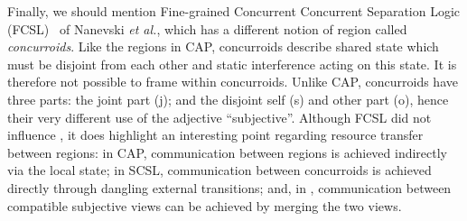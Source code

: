 


Finally, we should mention Fine-grained Concurrent Concurrent Separation Logic
(FCSL)~\cite{scsl-esop14} of Nanevski {\em et al.}, which has a different notion
of region called {\em concurroids}. Like the regions in CAP,  concurroids describe
shared state which must be disjoint from each other and static
interference acting on this state. It is therefore not
possible to frame within concurroids. Unlike CAP,
concurroids have three parts: the joint part (j);  and the disjoint self (s) and other part (o), hence  their very different use of  the adjective ``subjective''.
Although FCSL did  not influence \colosl, it does 
highlight  an interesting point regarding resource transfer between regions: in CAP, communication between regions is achieved indirectly via the local state; in SCSL, communication
between concurroids is achieved directly through dangling external
transitions; and, in \colosl, communication between compatible
subjective views can be achieved by merging the two views. 






